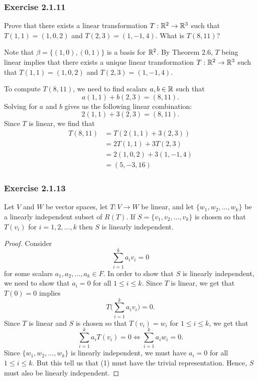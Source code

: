 \subsubsection{Exercise 2.1.11} Prove that there exists a linear transformation \( T: \mathbb{R}^{2} \to \mathbb{R}^{3} \) such that \( T(1,1) = (1,0,2) \) and \( T(2,3) = (1,-1,4) \). What is \( T(8,11)  \)?
\begin{solution}
    Note that \( \beta = \{ (1,0), (0,1) \}  \) is a basis for \( \mathbb{R}^{2} \). By Theorem 2.6, \( T \) being linear implies that there exists a unique linear transformation \( T: \mathbb{R}^{2} \to  \mathbb{R}^{3} \) such that \( T(1,1) = (1,0,2)  \) and \( T(2,3) = (1,-1,4) \). 

    To compute \( T(8,11) \), we need to find scalars \( a,b \in \mathbb{R}  \) such that
    \[  a(1,1) + b(2,3) = (8,11). \]
    Solving for \( a  \) and \( b \) gives us the following linear combination:
    \[ 2(1,1) + 3(2,3) = (8,11). \]
    Since \( T  \) is linear, we find that
    \begin{align*}
       T(8,11) &= T( 2(1,1)  + 3(2,3) ) \\
               &= 2T(1,1) + 3T(2,3) \\
               &= 2(1,0,2) + 3(1,-1,4) \\
               &= (5,-3, 16)
    \end{align*}
\end{solution}


\subsubsection{Exercise 2.1.13} Let \( V  \) and \( W  \) be vector spaces, let \( T: V \to W  \) be linear, and let \( \{ w_{1}, w_{2}, \dots, w_{k } \}  \) be a linearly independent subset of \( R(T) \). If \( S = \{ v_{1}, v_{2}, \dots, v_{k} \}  \) is chosen so that \( T(v_{i}) \) for \( i = 1,2,\dots, k  \) then \( S  \) is linearly independent.
\begin{proof}
    Consider
    \[  \sum_{ i=1 }^{ k  } a_{i} v_{i} = 0 \tag{1}  \]
    for some scalars \( a_{1}, a_{2}, \dots, a_{k } \in F  \). In order to show that \( S  \) is linearly independent, we need to show that \( a_{i} = 0   \) for all \( 1 \leq i \leq k  \). Since \( T  \) is linear, we get that \( T(0) = 0  \) implies
    \[  T \Big( \sum_{ i=1 }^{ k  } a_{i} v_{i} \Big) = 0.  \]
    Since \( T  \) is linear and \( S  \) is chosen so that \( T(v_{i}) = w_{i}  \) for \( 1 \leq i \leq k  \), we get that
    \[  \sum_{ i=1 }^{ k  } a_{i} T(v_{i}) =  0 \iff \sum_{ i=1 }^{ k  } a_{i} w_{i} = 0.   \]
    Since \( \{ w_{1}, w_{2}, \dots, w_{k} \}  \) is linearly independent, we must have \( a_{i} = 0  \) for all \( 1 \leq i \leq k  \). But this tell us that (1) must have the trivial representation. Hence, \( S  \) must also be linearly independent. 
\end{proof}

